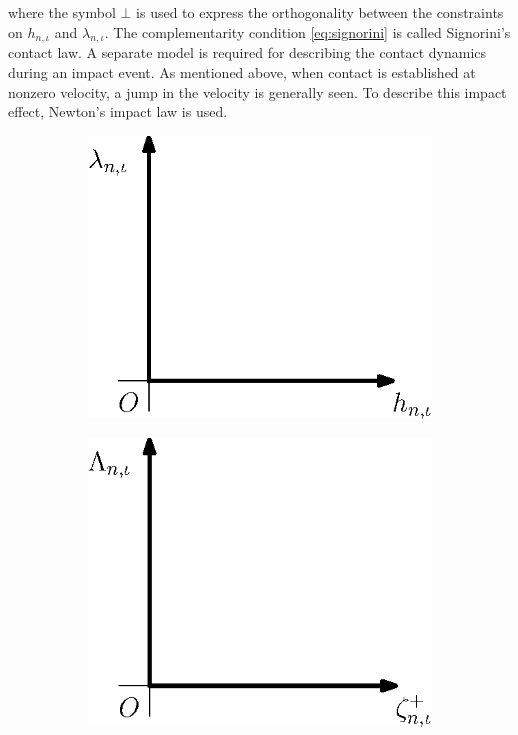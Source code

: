 \documentclass[../DC2017114Bouma.tex]{subfiles}
\begin{document}
where the symbol $\bot$ is used to express the orthogonality between the constraints on $h_{n,\iota}$ and $\lambda_{n,\iota}$. The complementarity condition \eqref{eq:signorini} is called Signorini's contact law. A separate model is required for describing the contact dynamics during an impact event. As mentioned above, when contact is established at nonzero velocity, a jump in the velocity is generally seen. To describe this impact effect, Newton's impact law is used.
\begin{figure}[h]
\centering
\begin{subfigure}{0.3\textwidth}
\centering
\includegraphics[width=\linewidth]{signorinicontact.eps}
\caption{}\label{fig:signorinicontact}
\end{subfigure}
\qquad
\begin{subfigure}{0.3\textwidth}
\centering
\includegraphics[width=\linewidth]{newtonimpact.eps}

\end{subfigure}
\end{figure}
\end{document}
